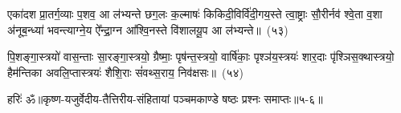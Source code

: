 {\anuvakamend[{सोमा॑य स्व॒राज्ञे॒ चतु॑स्त्रिꣳशत्}]}%

एका॑\-दश प्रा॒तर्ग॒व्याः प॒शव॒ आ ल॑भ्यन्ते छग॒लः क॒ल्माषः॑ किकिदी॒विर्वि॑दी॒गय॒स्ते त्वा॒ष्ट्राः सौ॒रीर्नव॑ श्वे॒ता व॒शा अ॑नूब॒न्ध्या॑ भवन्त्याग्ने॒य ऐ᳚न्द्रा॒ग्न आ᳚श्वि॒नस्ते वि॑शालयू॒प आ ल॑भ्यन्ते॥~(५३)\ip

{\anuvakamend[{एका॑\-दश॒ पञ्च॑विꣳशतिः}]}%

पि॒शङ्गा॒स्त्रयो॑ वास॒न्ताः सा॒रङ्गा॒स्त्रयो॒ ग्रैष्माः॒ पृष॑न्त॒स्त्रयो॒ वार्\mbox{}षि॑काः॒ पृश्ञ॑य॒स्त्रयः॑ शार॒दाः पृ॑श्ञिस॒क्थास्त्रयो॒ हैम॑न्तिका अवलि॒प्तास्त्रयः॑ शैशि॒राः सं॑वथ्स॒राय॒ निव॑क्षसः॥~(५४)\ip

{\anuvakamend[{पि॒शङ्गा॑ विꣳश॒तिः}]}%

{हरिः॑ ॐ}{॥कृष्ण-यजुर्वेदीय-तैत्तिरीय-संहितायां पञ्चमकाण्डे षष्ठः प्रश्नः समाप्तः॥५-६॥}


